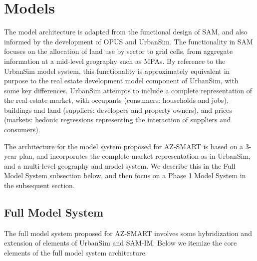 \section{Models}

The model architecture is adapted from the functional design of SAM, and also informed by the development of OPUS and UrbanSim. The functionality in SAM focuses on the allocation of land use by sector to grid cells, from aggregate information at a mid-level geography such as MPAs.  By reference to the UrbanSim model system, this functionality is approximately equivalent in purpose to the real estate development model component of UrbanSim, with some key differences.  UrbanSim attempts to include a complete representation of the real estate market, with occupants (consumers: households and jobs), buildings and land (suppliers: developers and property owners), and prices (markets: hedonic regressions representing the interaction of suppliers and consumers).

The architecture for the model system proposed for AZ-SMART is based on a 3-year plan, and incorporates the complete market representation as in UrbanSim, and a multi-level geography and model system.  We describe this in the Full Model System subsection below, and then focus on a Phase 1 Model System in the subsequent section.

\subsection{Full Model System}
The full model system proposed for AZ-SMART involves some hybridization and extension of elements of UrbanSim and SAM-IM. Below we itemize the core elements of the full model system architecture.

